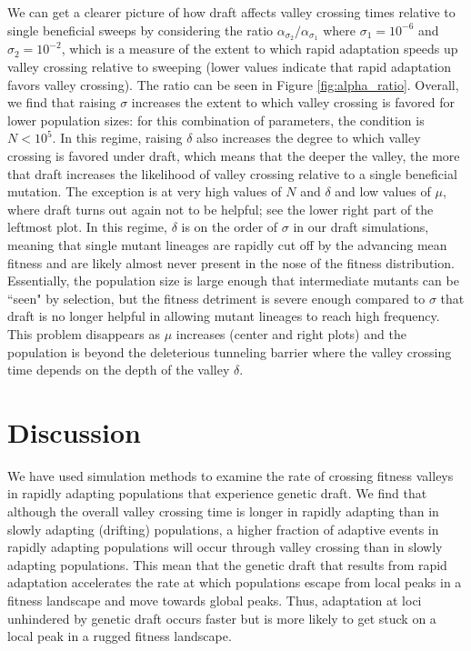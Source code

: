\documentclass[10pt,twocolumn,twoside]{gsajnl}
\begin{document}
\begin{spacing}{1.5}
We can get a clearer picture of how draft affects valley crossing times relative to single beneficial sweeps by considering the ratio $\alpha_{\sigma_2} / \alpha_{\sigma_1}$ where $\sigma_1=10^{-6}$ and $\sigma_2=10^{-2}$, which is a measure of the extent to which rapid adaptation speeds up valley crossing relative to sweeping (lower values indicate that rapid adaptation favors valley crossing).
The ratio can be seen in Figure \ref{fig:alpha_ratio}.
Overall, we find that raising $\sigma$ increases the extent to which valley crossing is favored for lower population sizes: for this combination of parameters, the condition is $N < 10^{5}$.
In this regime, raising $\delta$ also increases the degree to which valley crossing is favored under draft, which means that the deeper the valley, the more that draft increases the likelihood of valley crossing relative to a single beneficial mutation.
The exception is at very high values of $N$ and $\delta$ and low values of $\mu$, where draft turns out again not to be helpful; see the lower right part of the leftmost plot.
In this regime, $\delta$ is on the order of $\sigma$ in our draft simulations, meaning that single mutant lineages are rapidly cut off by the advancing mean fitness and are likely almost never present in the nose of the fitness distribution.
Essentially, the population size is large enough that intermediate mutants can be ``seen" by selection, but the fitness detriment is severe enough compared to $\sigma$ that draft is no longer helpful in allowing mutant lineages to reach high frequency.
This problem disappears as $\mu$ increases (center and right plots) and the population is beyond the deleterious tunneling barrier where the valley crossing time depends on the depth of the valley $\delta$.

\section{Discussion}

We have used simulation methods to examine the rate of crossing fitness valleys in rapidly adapting populations that experience genetic draft.
We find that although the overall valley crossing time is longer in rapidly adapting than in slowly adapting (drifting) populations, a higher fraction of adaptive events in rapidly adapting populations will occur through valley crossing than in slowly adapting populations.
This mean that the genetic draft that results from rapid adaptation accelerates the rate at which populations escape from local peaks in a fitness landscape and move towards global peaks.
Thus, adaptation at loci unhindered by genetic draft occurs faster but is more likely to get stuck on a local peak in a rugged fitness landscape.


\end{spacing}
\end{document}
